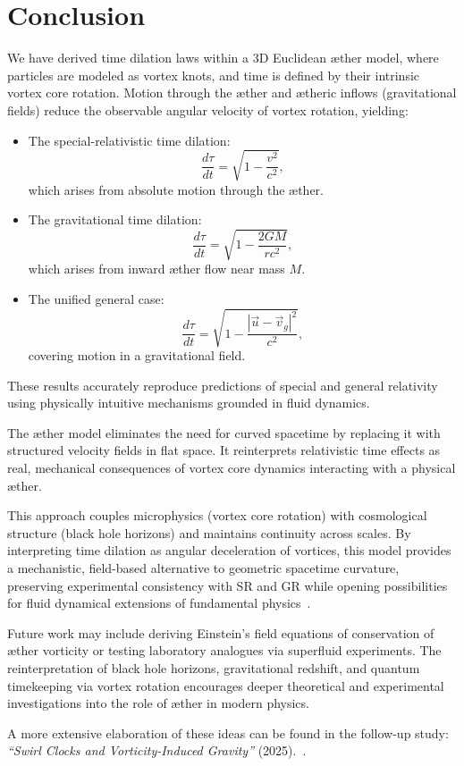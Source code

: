
\section{Conclusion}

We have derived time dilation laws within a 3D Euclidean æther model, where particles are modeled as vortex knots, and time is defined by their intrinsic vortex core rotation. Motion through the æther and ætheric inflows (gravitational fields) reduce the observable angular velocity of vortex rotation, yielding:

\begin{itemize}
    \item The special-relativistic time dilation:
    \[
    \frac{d\tau}{dt} = \sqrt{1 - \frac{v^2}{c^2}},
    \]
    which arises from absolute motion through the æther.
    
    \item The gravitational time dilation:
    \[
    \frac{d\tau}{dt} = \sqrt{1 - \frac{2GM}{rc^2}},
    \]
    which arises from inward æther flow near mass $M$.
    
    \item The unified general case:
    \[
    \frac{d\tau}{dt} = \sqrt{1 - \frac{|\vec{u} - \vec{v}_g|^2}{c^2}},
    \]
    covering motion in a gravitational field.
\end{itemize}

These results accurately reproduce predictions of special and general relativity using physically intuitive mechanisms grounded in fluid dynamics.

The æther model eliminates the need for curved spacetime by replacing it with structured velocity fields in flat space. It reinterprets relativistic time effects as real, mechanical consequences of vortex core dynamics interacting with a physical æther.

This approach couples microphysics (vortex core rotation) with cosmological structure (black hole horizons) and maintains continuity across scales. By interpreting time dilation as angular deceleration of vortices, this model provides a mechanistic, field-based alternative to geometric spacetime curvature, preserving experimental consistency with SR and GR while opening possibilities for fluid dynamical extensions of fundamental physics~\cite{Winterberg2002-PlanckAether,Schiller2022-maxforce}.

Future work may include deriving Einstein’s field equations of conservation of æther vorticity or testing laboratory analogues via superfluid experiments. The reinterpretation of black hole horizons, gravitational redshift, and quantum timekeeping via vortex rotation encourages deeper theoretical and experimental investigations into the role of æther in modern physics.

A more extensive elaboration of these ideas can be found in the follow-up study: \textit{“Swirl Clocks and Vorticity-Induced Gravity”} (2025).~\cite{vam2025unified}.